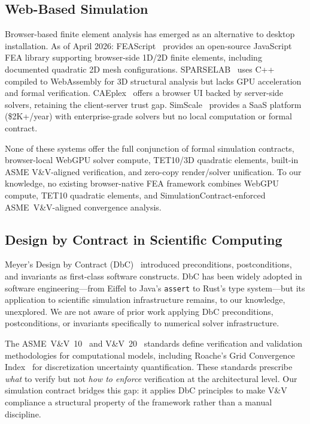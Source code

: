\documentclass[journal]{IEEEtran}
\begin{document}
\subsection{Web-Based Simulation}
\label{sec:related:web}

Browser-based finite element analysis has emerged as an alternative to
desktop installation. As of April 2026:
FEAScript~\cite{FEAScript2026} provides an open-source JavaScript FEA
library supporting browser-side 1D/2D finite elements, including documented
quadratic 2D mesh configurations.
SPARSELAB~\cite{SPARSELAB2026} uses C++ compiled to WebAssembly for 3D
structural analysis but lacks GPU acceleration and formal verification.
CAEplex~\cite{CAEplex2026} offers a browser UI backed by server-side
solvers, retaining the client-server trust gap. SimScale~\cite{SimScale2026}
provides a SaaS platform (\$2K+/year) with enterprise-grade solvers but no
local computation or formal contract.

None of these systems offer the full conjunction of formal simulation
contracts, browser-local WebGPU solver compute, TET10/3D quadratic
elements, built-in ASME V\&V-aligned verification, and zero-copy
render/solver unification.
To our knowledge, no existing browser-native FEA framework combines
WebGPU compute, TET10 quadratic elements, and SimulationContract-enforced
ASME~V\&V-aligned convergence analysis.


\subsection{Design by Contract in Scientific Computing}
\label{sec:related:dbc}

Meyer's Design by Contract (DbC)~\cite{Meyer1988,Meyer1992} introduced
preconditions, postconditions, and invariants as first-class software
constructs. DbC has been widely adopted in software engineering---from
Eiffel to Java's \texttt{assert} to Rust's type system---but its application
to scientific simulation infrastructure remains, to our knowledge, unexplored.
We are not aware of prior work applying DbC preconditions, postconditions,
or invariants specifically to numerical solver infrastructure.

The ASME~V\&V~10~\cite{ASMEVV10} and V\&V~20~\cite{ASMEVV20} standards
define verification and validation methodologies for computational models,
including Roache's Grid Convergence Index~\cite{Roache1994} for
discretization uncertainty quantification. These standards prescribe
\emph{what} to verify but not \emph{how to enforce} verification at the
architectural level. Our simulation contract bridges this gap: it applies
DbC principles to make V\&V compliance a structural property of the
framework rather than a manual discipline.
\end{document}
